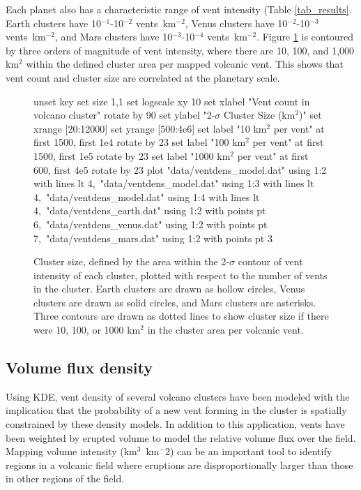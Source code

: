 Each planet also has a characteristic range of vent intensity (Table \ref{tab_results}. Earth clusters have 10$^{-1}$-10$^{-2}$ vents~km$^{-2}$, Venus clusters have 10$^{-2}$-10$^{-3}$ vents~km$^{-2}$, and Mars clusters have 10$^{-3}$-10$^{-4}$ vents~km$^{-2}$. Figure \ref{fig_ventdens} is contoured by three orders of magnitude of vent intensity, where there are 10, 100, and 1,000 km$^2$ within the defined cluster area per mapped volcanic vent. This shows that vent count and cluster size are correlated at the planetary scale.

\begin{figure}[h!]
	\centering
	\begin{gnuplot}[terminal=latex, terminaloptions=rotate]
		unset key
		set size 1,1
		set logscale xy 10
		set xlabel "Vent count in volcano cluster" rotate by 90
		set ylabel "2-$\sigma$ Cluster Size (km$^2$)"
		set xrange [20:12000]
		set yrange [500:4e6]
		set label "10 km$^2$ per vent" at first 1500, first 1e4 rotate by 23
		set label "100 km$^2$ per vent" at first 1500, first 1e5 rotate by 23
		set label "1000 km$^2$ per vent" at first 600, first 4e5 rotate by 23
		plot "data/ventdens_model.dat" using 1:2 with lines lt 4,\
		"data/ventdens_model.dat" using 1:3 with lines lt 4,\
		"data/ventdens_model.dat" using 1:4 with lines lt 4,\
		"data/ventdens_earth.dat" using 1:2 with points pt 6,\
		"data/ventdens_venus.dat" using 1:2 with points pt 7,\
		"data/ventdens_mars.dat" using 1:2 with points pt 3
	\end{gnuplot}
	\caption[Cluster size, defined by the area within the 2-$\sigma$ contour of vent intensity of each cluster, plotted with respect to the number of vents in the cluster]{Cluster size, defined by the area within the 2-$\sigma$ contour of vent intensity of each cluster, plotted with respect to the number of vents in the cluster. Earth clusters are drawn as hollow circles, Venus clusters are drawn as solid circles, and Mars clusters are asterisks. Three contours are drawn as dotted lines to show cluster size if there were 10, 100, or 1000 km$^2$ in the cluster area per volcanic vent.}
	\label{fig_ventdens}
\end{figure}
	

\subsection{Volume flux density}
Using KDE, vent density of several volcano clusters have been modeled with the implication that the probability of a new vent forming in the cluster is spatially constrained by these density models. In addition to this application, vents have been weighted by erupted volume to model the relative volume flux over the field. Mapping volume intensity (km$^3$~km$^-2$) can be an important tool to identify regions in a volcanic field where eruptions are disproportionally larger than those in other regions of the field.

